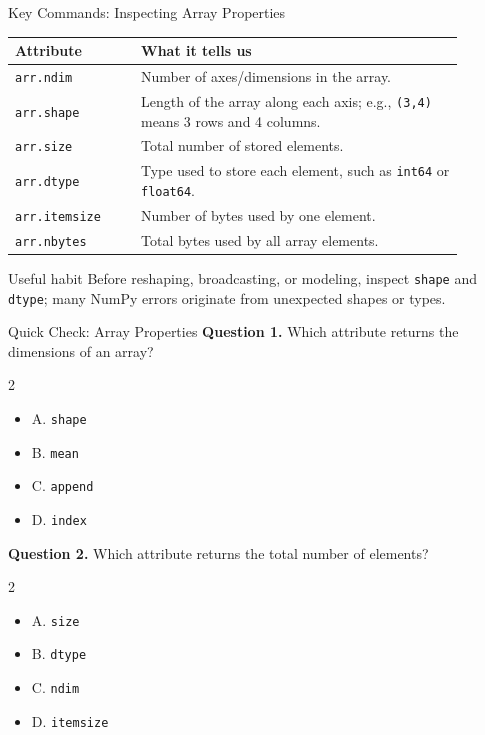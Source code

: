 \documentclass[aspectratio=169,11pt]{beamer}
\newcommand{\quiztitle}[1]{\textbf{\textcolor{QuizOrange}{#1}}}
\begin{document}
\begin{frame}{Key Commands: Inspecting Array Properties}
\small
\begin{tabular}{p{0.25\linewidth}p{0.64\linewidth}}
\toprule
\textbf{Attribute} & \textbf{What it tells us} \\
\midrule
\texttt{arr.ndim} & Number of axes/dimensions in the array. \\
\texttt{arr.shape} & Length of the array along each axis; e.g., \texttt{(3,4)} means 3 rows and 4 columns. \\
\texttt{arr.size} & Total number of stored elements. \\
\texttt{arr.dtype} & Type used to store each element, such as \texttt{int64} or \texttt{float64}. \\
\texttt{arr.itemsize} & Number of bytes used by one element. \\
\texttt{arr.nbytes} & Total bytes used by all array elements. \\
\bottomrule
\end{tabular}
\begin{block}{Useful habit}
Before reshaping, broadcasting, or modeling, inspect \texttt{shape} and \texttt{dtype}; many NumPy errors originate from unexpected shapes or types.
\end{block}
\end{frame}

\begin{frame}{Quick Check: Array Properties}
\small
\quiztitle{Question 1.} Which attribute returns the dimensions of an array?
\begin{multicols}{2}
\begin{itemize}
  \item A. \texttt{shape}
  \item B. \texttt{mean}
  \item C. \texttt{append}
  \item D. \texttt{index}
\end{itemize}
\end{multicols}
\vspace{0.4em}
\quiztitle{Question 2.} Which attribute returns the total number of elements?
\begin{multicols}{2}
\begin{itemize}
  \item A. \texttt{size}
  \item B. \texttt{dtype}
  \item C. \texttt{ndim}
  \item D. \texttt{itemsize}
\end{itemize}
\end{multicols}
\end{frame}
\end{document}
